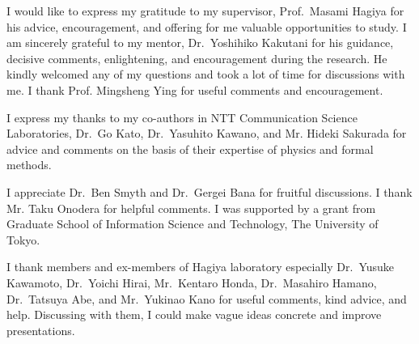 \begin{acknowledge}
 I would like to express my gratitude 
 to my supervisor, Prof.\ Masami Hagiya for his advice, encouragement,
 and offering for me valuable opportunities to study.
 I am sincerely grateful to my mentor, Dr.\ Yoshihiko Kakutani
 for his guidance, 
 decisive comments, enlightening, and encouragement during the
 research. He kindly welcomed any of my questions and 
 took a lot of time for discussions with me.
 I thank Prof. Mingsheng Ying for useful comments and 
 encouragement.

 I express my thanks to my co-authors in
 NTT Communication Science Laboratories,
 Dr.\ Go Kato, Dr.\ Yasuhito Kawano,
 and Mr. Hideki Sakurada for advice and
 comments on the basis of their expertise of physics and formal methods.

 I appreciate Dr.\ Ben Smyth and Dr.\ Gergei Bana for
 fruitful discussions.
 I thank Mr. Taku Onodera for helpful comments.
 I was supported by a grant from Graduate School
 of Information Science and Technology, The University of Tokyo.

 I thank members and ex-members of Hagiya
 laboratory especially Dr.\ Yusuke Kawamoto, Dr.\ Yoichi Hirai,
 Mr.\ Kentaro Honda, Dr.\ Masahiro Hamano,
 Dr.\ Tatsuya Abe, and Mr.\ Yukinao Kano for useful comments,
 kind advice, and help.
 Discussing with them, I could make vague ideas concrete and
 improve presentations.
\end{acknowledge}